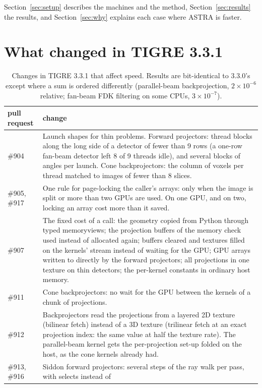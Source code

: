 \documentclass[11pt,a4paper]{article}
\begin{document}
Section~\ref{sec:setup} describes the machines and the method, Section~\ref{sec:results} the results, and
Section~\ref{sec:why} explains each case where ASTRA is faster.

\section{What changed in TIGRE 3.3.1}\label{sec:changes}
\begin{table}[H]
\centering\small
\caption{Changes in TIGRE 3.3.1 that affect speed. Results are bit-identical to 3.3.0's except where a
sum is ordered differently (parallel-beam backprojection, $2\times10^{-6}$ relative; fan-beam FDK filtering on
some CPUs, $3\times10^{-7}$).}
\label{tab:changes}
\begin{tabular}{>{\raggedright}p{}>{\raggedright\arraybackslash}p{}}
\toprule
pull request & change \\
\midrule
\#904 & Launch shapes for thin problems. Forward projectors: thread blocks along the long side of a detector of
fewer than 9 rows (a one-row fan-beam detector left 8 of 9 threads idle), and several blocks of angles per
launch. Cone backprojectors: the column of voxels per thread matched to images of fewer than 8 slices.\\
\#905, \#917 & One rule for page-locking the caller's arrays: only when the image is split or more than two
GPUs are used. On one GPU, and on two, locking an array cost more than it saved.\\
\#907 & The fixed cost of a call: the geometry copied from Python through typed memoryviews; the projection
buffers of the memory check used instead of allocated again; buffers cleared and textures filled on the
kernels' stream instead of waiting for the GPU; GPU arrays written to directly by the forward projectors; all
projections in one texture on thin detectors; the per-kernel constants in ordinary host memory.\\
\#911 & Cone backprojectors: no wait for the GPU between the kernels of a chunk of projections.\\
\#912 & Backprojectors read the projections from a layered 2D texture (bilinear fetch) instead of a 3D
texture (trilinear fetch at an exact projection index: the same value at half the texture rate). The
parallel-beam kernel gets the per-projection set-up folded on the host, as the cone kernels already had.\\
\#913, \#916 & Siddon forward projectors: several steps of the ray walk per pass, with selects instead of

\end{tabular}
\end{table}
\end{document}
